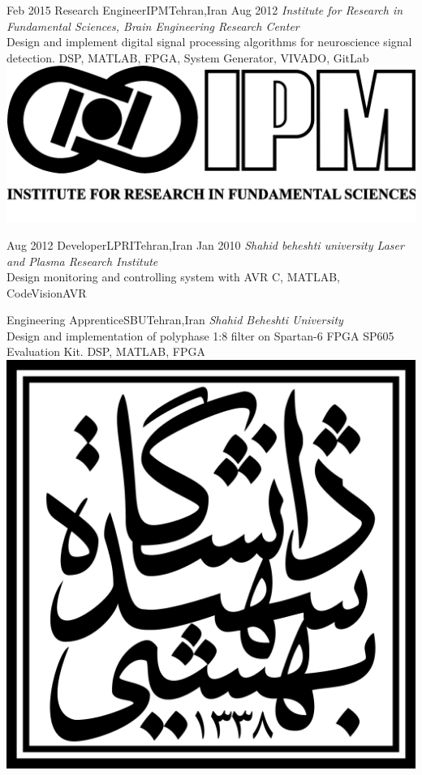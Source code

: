 \begin{experiences}
  \experience
  {Feb 2015} {Research Engineer}{IPM}{Tehran,Iran}
  {Aug 2012} {
    \emph{Institute for Research in Fundamental Sciences, Brain Engineering Research Center}\\
    Design and implement digital signal processing algorithms for neuroscience signal detection.
  }
  {DSP, MATLAB, FPGA, System Generator, VIVADO, GitLab}
  {\includegraphics[scale=0.025]{graphics/IPM_logo}}

  \emptySeparator

  \experience
  {Aug 2012} {Developer}{LPRI}{Tehran,Iran}
  {Jan 2010} {
    \emph{Shahid beheshti university Laser and Plasma Research Institute}\\
    Design  monitoring and controlling system with AVR
  }
  {C, MATLAB, CodeVisionAVR}
  {}

  \emptySeparator

  \experience
  {} {Engineering Apprentice}{SBU}{Tehran,Iran}
  {} {
    \emph{Shahid Beheshti University}\\
    Design and implementation of polyphase 1:8 filter on Spartan-6 FPGA SP605 Evaluation Kit.
  }
  {DSP, MATLAB, FPGA}
  {\includegraphics[scale=0.05]{graphics/SBU_logo}}


\end{experiences}
